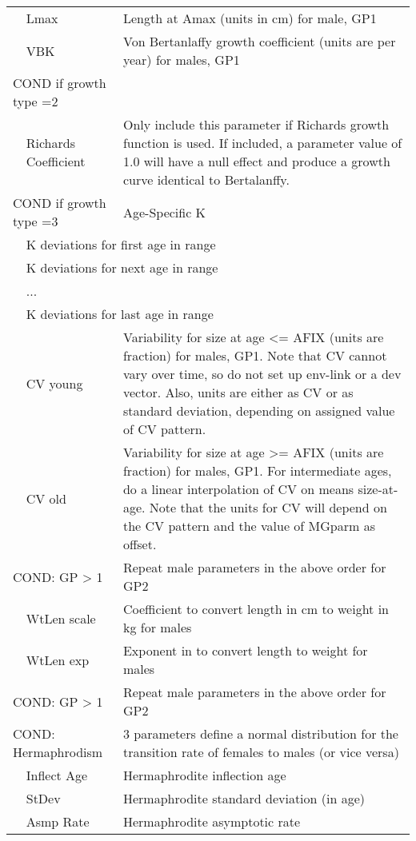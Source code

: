 \begin{center}
\begin{longtable}{p{1cm} p{2.5cm} p{10cm}}
		& Lmax & Length at Amax (units in cm) for male, GP1\ \\
		& VBK &  Von Bertanlaffy growth coefficient (units are per year) for males, GP1\\
		\hline
		\multicolumn{2}{l}{COND if growth type =2 } & \\
		& Richards Coefficient & Only include this parameter if Richards growth function is used.  If included, a parameter value of 1.0 will have a null effect and produce a growth curve identical to Bertalanffy.\\
		\multicolumn{2}{l}{COND if growth type =3 } & Age-Specific K \\
		& \multicolumn{2}{l}{K deviations for first age in range}\\
		& \multicolumn{2}{l}{K deviations for next age in range}\\
		& ... & \\
		& \multicolumn{2}{l}{K deviations for last age in range}\\
		\hline
		& CV young & Variability for size at age <= AFIX (units are fraction) for males, GP1.  Note that CV cannot vary over time, so do not set up env-link or a dev vector.  Also, units are either as CV or as standard deviation, depending on assigned value of CV pattern.\\
		& CV old &  Variability for size at age >= AFIX (units are fraction) for males, GP1. For intermediate ages, do a linear interpolation of CV on means size-at-age.  Note that the units for CV will depend on the CV pattern and the value of MGparm as offset.\\
		\multicolumn{2}{l}{COND: GP > 1} & Repeat male parameters in the above order for GP2\\
		\hline
		& WtLen scale & Coefficient to convert length in cm to weight in kg for males\\
	    & WtLen exp & Exponent in to convert length to weight for males\\
		\hline
		\multicolumn{2}{l}{COND: GP > 1} & Repeat male parameters in the above order for GP2\\
		\hline
		\multicolumn{2}{l}{COND: Hermaphrodism} & 3 parameters define a normal distribution for the transition rate of females to males (or vice versa)\\
		& Inflect Age & Hermaphrodite inflection age\\
		& StDev & Hermaphrodite standard deviation (in age) \\
		& Asmp Rate & Hermaphrodite asymptotic rate\\

\end{longtable}
\end{center}
